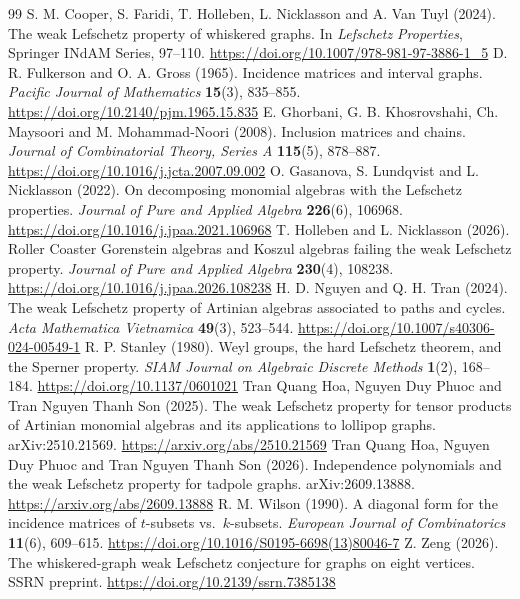 \documentclass[11pt,a4paper]{article}
\theoremstyle{definition}
\begin{document}
\begin{thebibliography}{99}
S. M. Cooper, S. Faridi, T. Holleben, L. Nicklasson and A. Van Tuyl (2024).
The weak Lefschetz property of whiskered graphs. In \emph{Lefschetz Properties}, Springer INdAM Series, 97--110.
\url{https://doi.org/10.1007/978-981-97-3886-1_5}
D. R. Fulkerson and O. A. Gross (1965). Incidence matrices and interval graphs. \emph{Pacific Journal of Mathematics} \textbf{15}(3), 835--855.
\url{https://doi.org/10.2140/pjm.1965.15.835}
E. Ghorbani, G. B. Khosrovshahi, Ch. Maysoori and M. Mohammad-Noori (2008). Inclusion matrices and chains. \emph{Journal of Combinatorial Theory, Series A} \textbf{115}(5), 878--887.
\url{https://doi.org/10.1016/j.jcta.2007.09.002}
O. Gasanova, S. Lundqvist and L. Nicklasson (2022). On decomposing monomial algebras with the Lefschetz properties. \emph{Journal of Pure and Applied Algebra} \textbf{226}(6), 106968.
\url{https://doi.org/10.1016/j.jpaa.2021.106968}
T. Holleben and L. Nicklasson (2026). Roller Coaster Gorenstein algebras and Koszul algebras failing the weak Lefschetz property. \emph{Journal of Pure and Applied Algebra} \textbf{230}(4), 108238.
\url{https://doi.org/10.1016/j.jpaa.2026.108238}
H. D. Nguyen and Q. H. Tran (2024). The weak Lefschetz property of Artinian algebras associated to paths and cycles. \emph{Acta Mathematica Vietnamica} \textbf{49}(3), 523--544.
\url{https://doi.org/10.1007/s40306-024-00549-1}
R. P. Stanley (1980). Weyl groups, the hard Lefschetz theorem, and the Sperner property. \emph{SIAM Journal on Algebraic Discrete Methods} \textbf{1}(2), 168--184.
\url{https://doi.org/10.1137/0601021}
Tran Quang Hoa, Nguyen Duy Phuoc and Tran Nguyen Thanh Son (2025). The weak Lefschetz property for tensor products of Artinian monomial algebras and its applications to lollipop graphs. arXiv:2510.21569.
\url{https://arxiv.org/abs/2510.21569}
Tran Quang Hoa, Nguyen Duy Phuoc and Tran Nguyen Thanh Son (2026). Independence polynomials and the weak Lefschetz property for tadpole graphs. arXiv:2609.13888.
\url{https://arxiv.org/abs/2609.13888}
R. M. Wilson (1990). A diagonal form for the incidence matrices of $t$-subsets vs.\ $k$-subsets. \emph{European Journal of Combinatorics} \textbf{11}(6), 609--615.
\url{https://doi.org/10.1016/S0195-6698(13)80046-7}
Z. Zeng (2026). The whiskered-graph weak Lefschetz conjecture for graphs on eight vertices. SSRN preprint.
\url{https://doi.org/10.2139/ssrn.7385138}
\end{thebibliography}
\end{document}
